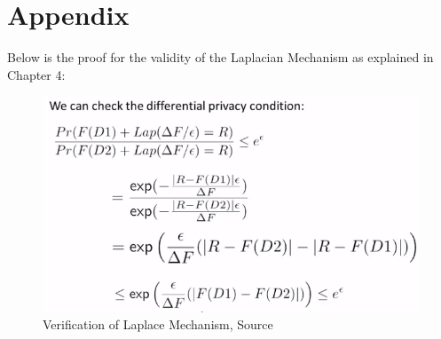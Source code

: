\documentclass[12pt]{report}
\theoremstyle{named}
\begin{document}
\chapter{Appendix}
\label{Appendix}
Below is the proof for the validity of the Laplacian Mechanism as explained in Chapter 4:
\begin{figure}[ht]
\centering
        \includegraphics[width=130mm,scale=1]{Images/ProofForLaplace.PNG}
    \caption{Verification of Laplace Mechanism, Source\cite{LaplaceVaiditity}}
    \label{fig:Laplace Verified}
\end{figure}
\end{document}
